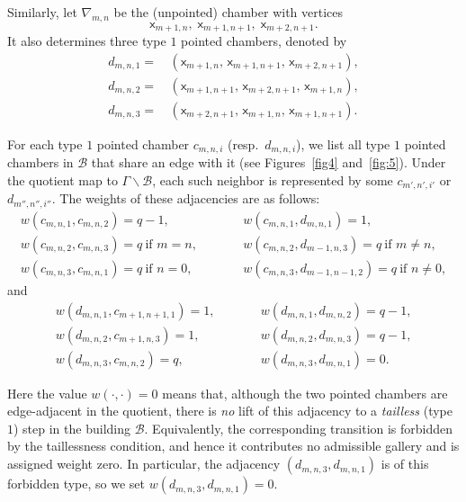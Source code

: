 \documentclass[11pt]{amsart}
\theoremstyle{definition}
\theoremstyle{remark}
\numberwithin{equation}{section}
\begin{document}
Similarly, let $\nabla_{m,n}$ be the (unpointed) chamber with vertices
\[
\mathsf{x}_{m+1,n},\; \mathsf{x}_{m+1,n+1},\; \mathsf{x}_{m+2,n+1}.
\]
It also determines three type $1$ pointed chambers, denoted by
\begin{align*}
d_{m,n,1}=&\,(\mathsf{x}_{m+1,n},\,\mathsf{x}_{m+1,n+1},\,\mathsf{x}_{m+2,n+1}),\\
d_{m,n,2}=&\,(\mathsf{x}_{m+1,n+1},\,\mathsf{x}_{m+2,n+1},\,\mathsf{x}_{m+1,n}),\\
d_{m,n,3}=&\,(\mathsf{x}_{m+2,n+1},\,\mathsf{x}_{m+1,n},\,\mathsf{x}_{m+1,n+1}).
\end{align*}

For each type $1$ pointed chamber $c_{m,n,i}$ (resp.\ $d_{m,n,i}$), we list all type $1$ pointed chambers in $\mathcal{B}$
that share an edge with it (see Figures~\ref{fig4} and~\ref{fig:5}).
Under the quotient map to $\Gamma\backslash\mathcal{B}$, each such neighbor is represented by some
$c_{m',n',i'}$ or $d_{m'',n'',i''}$.
The weights of these adjacencies are as follows:
\[
\begin{array}{lll}
w(c_{m,n,1},c_{m,n,2})=q-1, &\qquad& w(c_{m,n,1},d_{m,n,1})=1,\\[2pt]
w(c_{m,n,2},c_{m,n,3})=q \ \text{if } m=n, && w(c_{m,n,2},d_{m-1,n,3})=q \ \text{if } m\neq n,\\[2pt]
w(c_{m,n,3},c_{m,n,1})=q \ \text{if } n=0, && w(c_{m,n,3},d_{m-1,n-1,2})=q \ \text{if } n\neq 0,
\end{array}
\]
and
\[
\begin{array}{lll}
w(d_{m,n,1},c_{m+1,n+1,1})=1, &\qquad& w(d_{m,n,1},d_{m,n,2})=q-1,\\[2pt]
w(d_{m,n,2},c_{m+1,n,3})=1, && w(d_{m,n,2},d_{m,n,3})=q-1,\\[2pt]
w(d_{m,n,3},c_{m,n,2})=q, && w(d_{m,n,3},d_{m,n,1})=0.
\end{array}
\]


\medskip
\noindent
Here the value $w(\cdot,\cdot)=0$ means that, although the two pointed chambers are edge-adjacent in the quotient,
there is \emph{no} lift of this adjacency to a \emph{tailless} (type $1$) step in the building $\mathcal{B}$.
Equivalently, the corresponding transition is forbidden by the taillessness condition, and hence it contributes
no admissible gallery and is assigned weight zero. In particular, the adjacency $(d_{m,n,3},d_{m,n,1})$ is of this
forbidden type, so we set $w(d_{m,n,3},d_{m,n,1})=0$.
\end{document}
